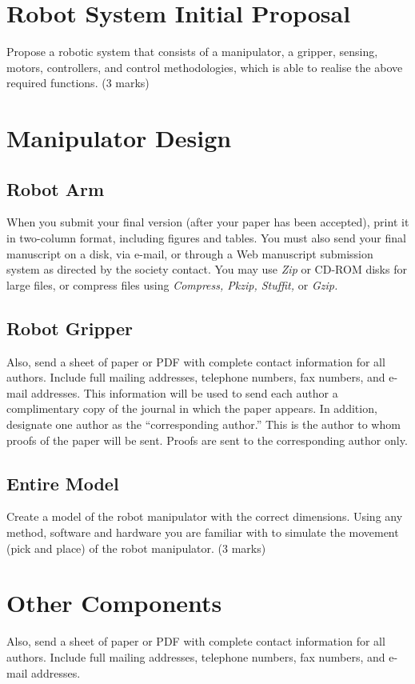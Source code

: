 \documentclass[transmag]{IEEEtran}
\begin{document}
 

\section{Robot System Initial Proposal}

Propose a robotic system that consists of a manipulator, a gripper, sensing, motors, controllers, and control methodologies, which is able to realise the above required functions. (3 marks)


\section{Manipulator Design}
\subsection{Robot Arm}
When you submit your final version (after your paper has been accepted), 
print it in two-column format, including figures and tables. You must also 
send your final manuscript on a disk, via e-mail, or through a Web 
manuscript submission system as directed by the society contact. You may use 
\emph{Zip} or CD-ROM disks for large files, or compress files using \emph{Compress, Pkzip, Stuffit,} or \emph{Gzip.} 


\subsection{Robot Gripper}
Also, send a sheet of paper or PDF with complete contact information for all 
authors. Include full mailing addresses, telephone numbers, fax numbers, and 
e-mail addresses. This information will be used to send each author a 
complimentary copy of the journal in which the paper appears. In addition, 
designate one author as the ``corresponding author.'' This is the author to 
whom proofs of the paper will be sent. Proofs are sent to the corresponding 
author only.

\subsection{Entire Model}
Create a model of the robot manipulator with the correct dimensions. Using any method, software and hardware you are familiar with to simulate the movement (pick and place) of the robot manipulator. (3 marks)

\section{Other Components}
Also, send a sheet of paper or PDF with complete contact information for all 
authors. Include full mailing addresses, telephone numbers, fax numbers, and 
e-mail addresses.
\end{document}
